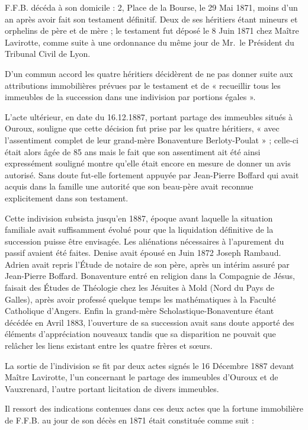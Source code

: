 \documentclass[11pt,a4paper]{report}
\begin{document}
F.F.B. décéda à son domicile : 2, Place de la Bourse, le 29 Mai 1871, moins d'un an après avoir fait son testament définitif. Deux de ses héritiers étant mineurs et orphelins de père et de mère ; le testament fut déposé le 8 Juin 1871 chez Maître Lavirotte, comme suite à une ordonnance du même jour de Mr.~le Président du Tribunal Civil de Lyon.

D'un commun accord les quatre héritiers décidèrent de ne pas donner suite aux attributions immobilières prévues par le testament et de « recueillir tous les immeubles de la succession dans une indivision par portions égales ».

L'acte ultérieur, en date du 16.12.1887, portant partage des immeubles situés à Ouroux, souligne que cette décision fut prise par les quatre héritiers, « avec l'assentiment complet de leur grand-mère Bonaventure Berloty-Poulat » ; celle-ci était alors âgée de 85 ans mais le fait que son assentiment ait été ainsi expressément souligné montre qu'elle était encore en mesure de donner un avis autorisé. Sans doute fut-elle fortement appuyée par Jean-Pierre Boffard qui avait acquis dans la famille une autorité que son beau-père avait reconnue explicitement dans son testament.


Cette indivision subsista jusqu'en 1887, époque avant laquelle la situation familiale avait suffisamment évolué pour que la liquidation définitive de la succession puisse être envisagée. Les aliénations nécessaires à l'apurement du passif avaient été faites. Denise avait épousé en Juin 1872 Joseph Rambaud. Adrien avait repris l'Étude de notaire de son père, après un intérim assuré par Jean-Pierre Boffard. Bonaventure entré en religion dans la Compagnie de Jésus, faisait des Études de Théologie chez les Jésuites à Mold (Nord du Pays de Galles), après avoir professé quelque temps les mathématiques à la Faculté Catholique d'Angers. Enfin la grand-mère Scholastique-Bonaventure étant décédée en Avril 1883, l'ouverture de sa succession avait sans doute apporté des éléments d'appréciation nouveaux tandis que sa disparition ne pouvait que relâcher les liens existant entre les quatre frères et sœurs.

La sortie de l'indivision se fit par deux actes signés le 16 Décembre 1887 devant Maître Lavirotte, l'un concernant le partage des immeubles d'Ouroux et de Vauxrenard, l'autre portant licitation de divers immeubles.

Il ressort des indications contenues dans ces deux actes que la fortune immobilière de F.F.B. au jour de son décès en 1871 était constituée comme suit :
\end{document}
